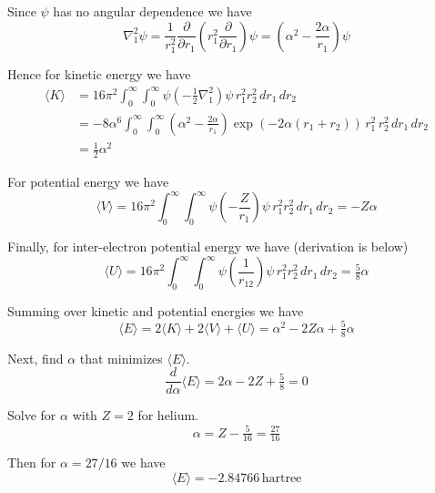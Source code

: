 \documentclass[12pt]{article}
\begin{document}
\noindent
Since $\psi$ has no angular dependence we have
\begin{equation*}
\nabla^2_1\psi=\frac{1}{r_1^2}\frac{\partial}{\partial r_1}
\left(r_1^2\frac{\partial}{\partial r_1}\right)\psi
=\left(\alpha^2-\frac{2\alpha}{r_1}\right)\psi
\end{equation*}

\noindent
Hence for kinetic energy we have
\begin{align*}
\langle K\rangle
&=
16\pi^2\int_0^\infty\int_0^\infty\psi\left(-\frac{1}{2}\nabla_1^2\right)\psi
\,r_1^2r_2^2
\,dr_1\,dr_2
\\
&=-8\alpha^6\int_0^\infty\int_0^\infty
\left(\alpha^2-\frac{2\alpha}{r_1}\right)\exp\left(-2\alpha(r_1+r_2)\right)
\,r_1^2\,r_2^2
\,dr_1\,dr_2
\\
&=\tfrac{1}{2}\alpha^2\tag{2}
\end{align*}

\noindent
For potential energy we have
\begin{equation*}
\langle V\rangle
=
16\pi^2\int_0^\infty\int_0^\infty\psi\left(-\frac{Z}{r_1}\right)\psi
\,r_1^2r_2^2
\,dr_1\,dr_2
=-Z\alpha\tag{3}
\end{equation*}

\noindent
Finally, for inter-electron potential energy we have (derivation is below)
\begin{equation*}
\langle U\rangle
=
16\pi^2\int_0^\infty\int_0^\infty\psi\left(\frac{1}{r_{12}}\right)\psi
\,r_1^2r_2^2
\,dr_1\,dr_2
=\tfrac{5}{8}\alpha
\tag{4}
\end{equation*}

\noindent
Summing over kinetic and potential energies we have
\begin{equation*}
\langle E\rangle=2\langle K\rangle+2\langle V\rangle+\langle U\rangle=\alpha^2-2Z\alpha+\tfrac{5}{8}\alpha
\end{equation*}

\noindent
Next, find $\alpha$ that minimizes $\langle E\rangle$.
\begin{equation*}
\frac{d}{d\alpha}\langle E\rangle=2\alpha-2Z+\tfrac{5}{8}=0
\end{equation*}

\noindent
Solve for $\alpha$ with $Z=2$ for helium.
\begin{equation*}
\alpha=Z-\tfrac{5}{16}=\tfrac{27}{16}
\end{equation*}

\noindent
Then for $\alpha=27/16$ we have
\begin{equation*}
\langle E\rangle=-2.84766\,\text{hartree}
\end{equation*}
\end{document}
